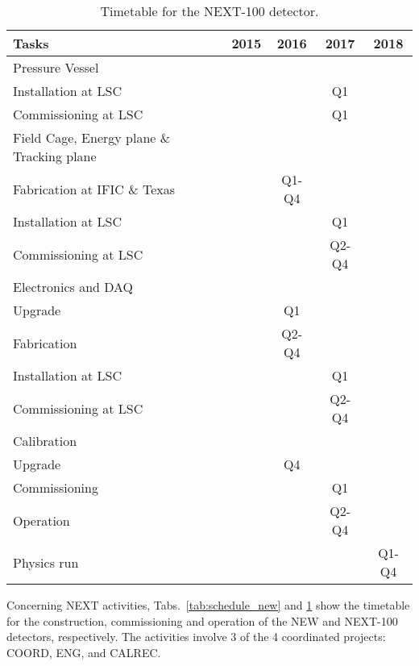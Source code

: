 \begin{table}[h!]
\begin{center}
\begin{tabular}{| l | c | c | c | c |}
\hline
Tasks & 2015 & 2016 & 2017 & 2018 \\
\hline
Pressure Vessel & & & &   \\
\hline
Installation at LSC &  & & Q1& \\
Commissioning at LSC & & &Q1 & \\
\hline
Field Cage, Energy plane \& Tracking plane & & & &  \\
\hline
Fabrication at IFIC \& Texas & & Q1-Q4 & & \\
Installation at LSC &  & &Q1 & \\
Commissioning at LSC &  & & Q2-Q4& \\
\hline
Electronics and DAQ & & & &   \\
\hline
Upgrade & & Q1 & & \\
Fabrication & & Q2-Q4 & & \\
Installation at LSC & & & Q1& \\
Commissioning at LSC & & & Q2-Q4 & \\
\hline
Calibration & & & &   \\
\hline
Upgrade & & Q4& & \\
Commissioning & & & Q1 & \\
Operation & & & Q2-Q4 & \\
\hline
Physics run & & & &  Q1-Q4 \\
\hline
\end{tabular}
\caption{Timetable for the NEXT-100 detector.}
\label{tab:schedule_next}
\end{center}
\end{table} 

Concerning NEXT activities, Tabs.~\ref{tab:schedule_new} and \ref{tab:schedule_next} show the timetable for the construction, commissioning and operation of the NEW and NEXT-100 detectors, respectively. The activities involve 3 of the 4 coordinated projects: COORD, ENG, and CALREC. 